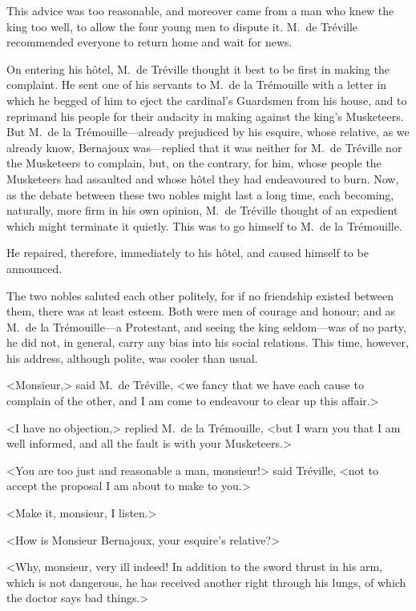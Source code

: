 This advice was too reasonable, and moreover came from a man who knew the king too well, to allow the four young men to dispute it. M.~de Tréville recommended everyone to return home and wait for news. 

On entering his hôtel, M.~de Tréville thought it best to be first in making the complaint. He sent one of his servants to M.~de la Trémouille with a letter in which he begged of him to eject the cardinal's Guardsmen from his house, and to reprimand his people for their audacity in making  against the king's Musketeers. But M.~de la Trémouille—already prejudiced by his esquire, whose relative, as we already know, Bernajoux was—replied that it was neither for M.~de Tréville nor the Musketeers to complain, but, on the contrary, for him, whose people the Musketeers had assaulted and whose hôtel they had endeavoured to burn. Now, as the debate between these two nobles might last a long time, each becoming, naturally, more firm in his own opinion, M.~de Tréville thought of an expedient which might terminate it quietly. This was to go himself to M.~de la Trémouille. 

He repaired, therefore, immediately to his hôtel, and caused himself to be announced. 

The two nobles saluted each other politely, for if no friendship existed between them, there was at least esteem. Both were men of courage and honour; and as M.~de la Trémouille—a Protestant, and seeing the king seldom—was of no party, he did not, in general, carry any bias into his social relations. This time, however, his address, although polite, was cooler than usual. 

<Monsieur,> said M.~de Tréville, <we fancy that we have each cause to complain of the other, and I am come to endeavour to clear up this affair.> 

<I have no objection,> replied M.~de la Trémouille, <but I warn you that I am well informed, and all the fault is with your Musketeers.> 

<You are too just and reasonable a man, monsieur!> said Tréville, <not to accept the proposal I am about to make to you.> 

<Make it, monsieur, I listen.> 

<How is Monsieur Bernajoux, your esquire's relative?> 

<Why, monsieur, very ill indeed! In addition to the sword thrust in his arm, which is not dangerous, he has received another right through his lungs, of which the doctor says bad things.> 

